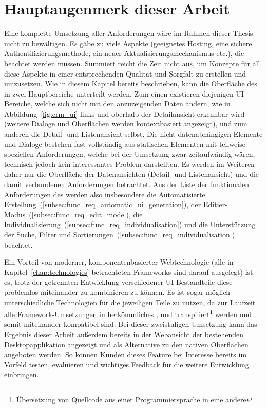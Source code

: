 \section{Hauptaugenmerk dieser Arbeit}
Eine komplette Umsetzung aller Anforderungen wäre im Rahmen dieser Thesis nicht zu bewältigen. Es gäbe zu viele Aspekte (geeignetes Hosting, eine sichere Authentifizierungsmethode, ein neuer Aktualisierungsmechanismus etc.), die beachtet werden müssen. Summiert reicht die Zeit nicht aus, um Konzepte für all diese Aspekte in einer entsprechenden Qualität und Sorgfalt zu erstellen und umzusetzen. 
Wie in diesem Kapitel bereits beschrieben, kann die Oberfläche des  in zwei Hauptbereiche unterteilt werden. Zum einen existieren diejenigen UI-Bereiche, welche sich nicht mit den anzuzeigenden Daten ändern, wie in Abbildung~\ref{fig:crm_ui} links und oberhalb der Detailansicht erkennbar wird (weitere Dialoge und Oberflächen werden kontextbasiert angezeigt), und zum anderen die Detail- und Listenansicht selbst. Die nicht datenabhängigen Elemente und Dialoge bestehen fast vollständig aus statischen Elementen mit teilweise speziellen Anforderungen, welche bei der Umsetzung zwar zeitaufwändig wären, technisch jedoch kein interessantes Problem darstellten. Es werden im Weiteren daher nur die Oberfläche der Datenansichten (Detail- und Listenansicht) und die damit verbundenen Anforderungen betrachtet.
Aus der Liste der funktionalen Anforderungen des  werden also insbesondere die Automatisierte Erstellung~(\ref{subsec:func_req_automatic_ui_generation}), der Editier-Modus~(\ref{subsec:func_req_edit_mode}), die Individualisierung~(\ref{subsec:func_req_individualisation}) und die Unterstützung der Suche, Filter und Sortierungen~(\ref{subsec:func_req_individualisation}) beachtet.

Ein Vorteil von moderner, komponentenbasierter Webtechnologie (alle in Kapitel~\ref{chap:technologies} betrachteten Frameworks sind darauf ausgelegt) ist es, trotz der getrennten Entwicklung verschiedener UI-Bestandteile diese problemlos miteinander zu kombinieren zu können. Es ist sogar möglich unterschiedliche Technologien für die jeweiligen Teile zu nutzen, da zur Laufzeit alle Framework-Umsetzungen in herkömmliches ,  und  transpiliert\footnote{Übersetzung von Quellcode aus einer Programmiersprache in eine andere} werden und somit miteinander kompatibel sind.
Bei dieser zweistufigen Umsetzung kann das Ergebnis dieser Arbeit außerdem bereits in der Webansicht der bestehenden Desktopapplikation angezeigt und als Alternative zu den nativen Oberflächen angeboten werden. So können Kunden dieses Feature bei Interesse bereits im Vorfeld testen, evaluieren und wichtiges Feedback für die weitere Entwicklung einbringen.
